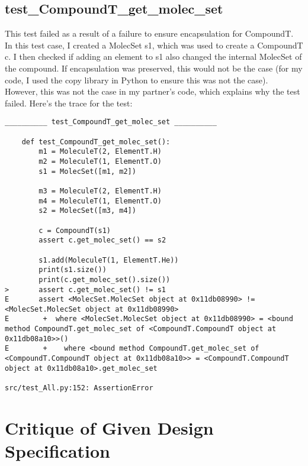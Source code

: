 \documentclass[12pt]{article}
\begin{document}
\subsection{test\_CompoundT\_get\_molec\_set}
This test failed as a result of a failure to ensure encapsulation for CompoundT. In this test case, I created a MolecSet s1, which was used to create a CompoundT c. I then checked if adding an element to s1 also changed the internal MolecSet of the compound. If encapsulation was preserved, this would not be the case (for my code, I used the copy library in Python to ensure this was not the case). However, this was not the case in my partner's code, which explains why the test failed. Here's the trace for the test:
\begin{lstlisting}
__________ test_CompoundT_get_molec_set __________

    def test_CompoundT_get_molec_set():
        m1 = MoleculeT(2, ElementT.H)
        m2 = MoleculeT(1, ElementT.O)
        s1 = MolecSet([m1, m2])

        m3 = MoleculeT(2, ElementT.H)
        m4 = MoleculeT(1, ElementT.O)
        s2 = MolecSet([m3, m4])

        c = CompoundT(s1)
        assert c.get_molec_set() == s2

        s1.add(MoleculeT(1, ElementT.He))
        print(s1.size())
        print(c.get_molec_set().size())
>       assert c.get_molec_set() != s1
E       assert <MolecSet.MolecSet object at 0x11db08990> != <MolecSet.MolecSet object at 0x11db08990>
E        +  where <MolecSet.MolecSet object at 0x11db08990> = <bound method CompoundT.get_molec_set of <CompoundT.CompoundT object at 0x11db08a10>>()
E        +    where <bound method CompoundT.get_molec_set of <CompoundT.CompoundT object at 0x11db08a10>> = <CompoundT.CompoundT object at 0x11db08a10>.get_molec_set

src/test_All.py:152: AssertionError
\end{lstlisting}


\clearpage
\section{Critique of Given Design Specification}


\clearpage
\end{document}
